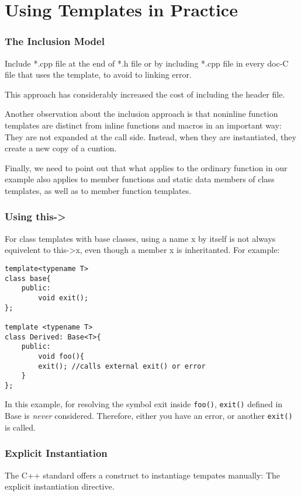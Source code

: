 \documentclass[11pt, a4paper]{book}
\begin{document}
\section{Using Templates in Practice}
\subsubsection{The Inclusion Model}
Include *.cpp file at the end of *.h file or by including *.cpp file in every doc-C file that uses the template, to avoid to linking error.

This approach has considerably increased the cost of including the header file.

Another observation about the inclusion approach is that noninline function templates are distinct from inline functions and macros in an important way: They are not expanded at the call side. Instead, when they are instantiated, they create a new copy of a cuntion.

Finally, we need to point out that what applies to the ordinary function in our example also applies to member functions and static data members of class templates, as well as to member function templates.
\subsubsection{Using this->}
For class templates with base classes, using a name x by itself is not always equivelent to this->x, even though a member x is inheritanted. For example:
\begin{verbatim}
template<typename T>
class base{
    public:
        void exit();
};

template <typename T>
class Derived: Base<T>{
    public:
        void foo(){
	    exit(); //calls external exit() or error
	}
};
\end{verbatim}

In this example, for resolving the symbol exit inside \verb|foo()|, \verb|exit()| defined in Base is \emph{never} considered. Therefore, either you have an error, or another \verb|exit()| is called.

\subsubsection{Explicit Instantiation}
The C++ standard offers a construct to instantiage tempates manually: The explicit instantiation directive.
\end{document}
